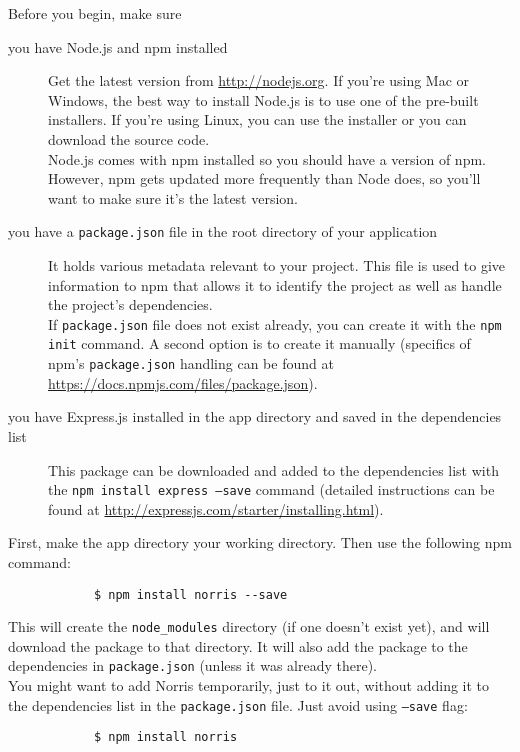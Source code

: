 		Before you begin, make sure
		\begin{description}
			\item[you have Node.js and npm installed] Get the latest version from \url{http://nodejs.org}. If you're using Mac or Windows, the best way to install Node.js is to use one of the pre-built installers. If you're using Linux, you can use the installer or you can download the source code.\\
			Node.js comes with npm installed so you should have a version of npm. However, npm gets updated more frequently than Node does, so you'll want to make sure it's the latest version.
			\item[you have a \texttt{package.json} file in the root directory of your application] It holds various metadata relevant to your project. This file is used to give information to npm that allows it to identify the project as well as handle the project's dependencies.\\
			If \texttt{package.json} file does not exist already, you can create it with the \texttt{npm init} command. A second option is to create it manually (specifics of npm's \texttt{package.json} handling can be found at \url{https://docs.npmjs.com/files/package.json}).
			\item[you have Express.js installed in the app directory and saved in the dependencies list] This package can be downloaded and added to the dependencies list with the \texttt{npm install express --save} command (detailed instructions can be found at \url{http://expressjs.com/starter/installing.html}).
		\end{description}
		First, make the app directory your working directory. Then use the following npm command:
		\begin{lstlisting}
			$ npm install norris --save
		\end{lstlisting}
		This will create the \texttt{node\_modules} directory (if one doesn't exist yet), and will download the package to that directory. It will also add the package to the dependencies in \texttt{package.json} (unless it was already there).\\
		You might want to add Norris temporarily, just to it out, without adding it to the dependencies list in the \texttt{package.json} file. Just avoid using \texttt{--save} flag:
		\begin{lstlisting}
			$ npm install norris
		\end{lstlisting}